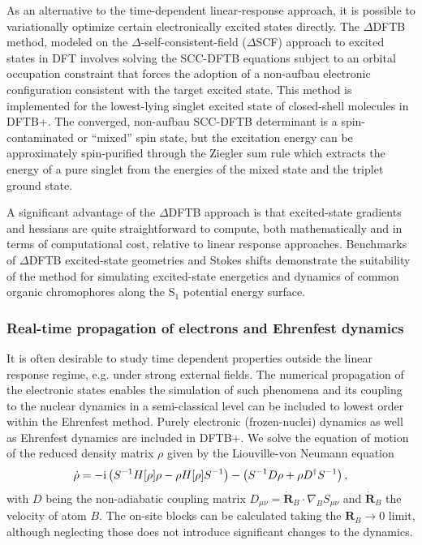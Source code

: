 \documentclass{revtex4-1}
\newcommand{\dftbp}{DFTB+}
\begin{document}
As an alternative to the time-dependent linear-response approach, it is possible
to variationally optimize certain electronically excited states directly. The
$\Delta$DFTB method, modeled on the $\Delta$-self-consistent-field ($\Delta$SCF)
approach to excited states in DFT\cite{Ziegler1977,Kowalczyk2011} involves
solving the SCC-DFTB equations subject to an orbital occupation constraint that
forces the adoption of a non-aufbau electronic configuration consistent with the
target excited state. This method is implemented for the lowest-lying singlet
excited state of closed-shell molecules in \dftbp{}.\cite{Kowalczyk2016} The
converged, non-aufbau SCC-DFTB determinant is a spin-contaminated or ``mixed''
spin state, but the excitation energy can be approximately spin-purified through
the Ziegler sum rule which extracts the energy of a pure singlet from the
energies of the mixed state and the triplet ground state.

A significant advantage of the $\Delta$DFTB approach is that excited-state
gradients and hessians are quite straightforward to compute, both mathematically
and in terms of computational cost, relative to linear response
approaches. Benchmarks of $\Delta$DFTB excited-state geometries and Stokes
shifts\cite{Kowalczyk2016} demonstrate the suitability of the method for
simulating excited-state energetics and dynamics of common organic chromophores
along the S$_1$ potential energy surface.

\subsubsection{Real-time propagation of electrons and Ehrenfest dynamics}

It is often desirable to study time dependent properties outside the linear
response regime, e.g. under strong external fields. The numerical propagation of
the electronic states enables the simulation of such phenomena and its coupling
to the nuclear dynamics in a semi-classical level can be included to lowest order
within the Ehrenfest method. Purely electronic (frozen-nuclei) dynamics as well
as Ehrenfest dynamics are included in \dftbp{}. We solve the equation of motion
of the reduced density matrix $\rho$ given by the Liouville-von Neumann equation
\begin{equation}
  \dot{\rho}=-\mathrm{i}\left(S^{-1} H[\rho] \rho-\rho H[\rho]
  S^{-1}\right)-\left(S^{-1} D \rho+\rho D^{\dagger} S^{-1}\right)
  \label{eq:rhodot}
  \text,
\end{equation}
with $D$ being the non-adiabatic coupling matrix $D_{\mu \nu} =
\dot{\mathbf{R}}_B \cdot \nabla_B S_{\mu \nu}$ and $\dot{\mathbf{R}}_B$ the
velocity of atom $B$. The on-site blocks can be calculated taking the
$\mathbf{R}_B \to 0$ limit, although neglecting those does not introduce
significant changes to the dynamics.\cite{Niehaus:2005da}
\end{document}
